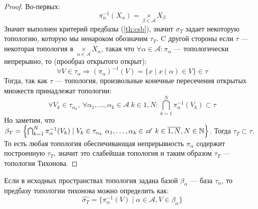 \begin{proof}
	Во-первых: 
	$$
	\pi_\alpha^{-1}(X_\alpha) = \underset{\beta \in \mathscr{A}}{\times} X_\beta
	$$
	Значит выполнен критерий предбазы (\ref{th:csb}), значит $\sigma_T$ задает некоторую топологию, которую мы ненароком обозначим $\tau_T$. C другой стороны если $\tau$ --- некоторая топология в $\underset{\alpha \in \mathscr{A}}{\times} X_\alpha$, такая что $\forall \alpha \in \mathscr{A} :\pi_\alpha$ --- топологически непрерывно, то (прообраз открытого открыт):
	$$
	\forall V \in \tau_\alpha \Rightarrow (\pi_\alpha)^{-1}(V)  = \{x \mid x(\alpha) \in V\}\in \tau
	$$
	Тогда, так как $\tau$ --- топология, произвольные конечные пересечения открытых множеств принадлежат топологии:
	$$
	\forall V_k \in \tau_{\alpha_k}, \ \forall \alpha_1, \dots, \alpha_k \in \mathscr{A} \ k \in \overline{1, N}: \bigcap_{k = 1}^N \pi_\alpha^{-1}(V_k) \subset \tau
	$$
	Но заметим, что $\beta_T =  \left\{\bigcap_{k = 1}^N \pi_\alpha^{-1}(V_k) \mid  V_k \in \tau_{\alpha_k}\ \alpha_1, \dots, \alpha_k \in \mathscr{A} \ k \in \overline{1, N}, N \in \mathbb{N}\right\}$. Тогда $\tau_T \subset \tau$. То есть любая топология обеспечивающая непрерывность $\pi_\alpha$ содержит построенную $\tau_T$, значит это слабейшая топология и таким образом $\tau_T$ --- топология Тихонова.
\end{proof}
\begin{remark}
	Если в исходных пространствах топология задана базой $\beta_\alpha$ --- база $\tau_\alpha$, то предбазу топологии тихонова можно определить как:
	$$
	\hat{\sigma_T} = \{\pi_\alpha^{-1}(V) \mid \alpha \in \mathscr{A}, V \in \beta_\alpha\}
	$$
\end{remark}

